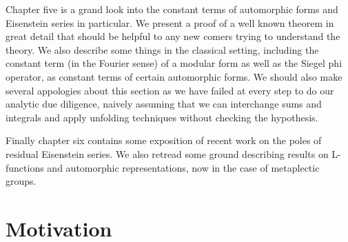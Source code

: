 Chapter five is a grand look into the constant terms of automorphic forms and Eisenstein series in particular. We present a proof of a well known theorem in great detail that should be helpful to any new comers trying to understand the theory. We also describe some things in the classical setting, including the constant term (in the Fourier sense) of a modular form as well as the Siegel phi operator, as constant terms of certain automorphic forms. We should also make several appologies about this section as we have failed at every step to do our analytic due diligence, naively assuming that we can interchange sums and integrals and apply unfolding techniques without checking the hypothesis. 

Finally chapter six contains some exposition of recent work on the poles of residual Eisenstein series. We also retread some ground describing results on L-functions and automorphic representations, now in the case of metaplectic groups.

\section*{Motivation}

